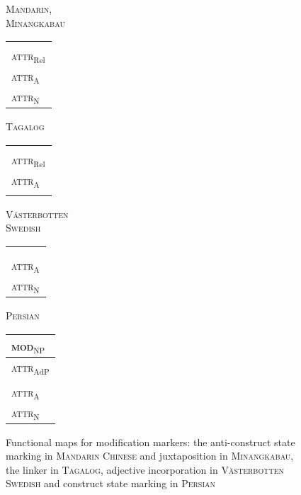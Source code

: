 \begin{figure}
\parbox[b]{0.20\textwidth}{
\begin{center}\textsc{Mandarin},\\\textsc{Minangkabau}\\
\medskip
\begin{tabular}{| l |}
\hline
\\
\hline
\hline
\\
\hline
\textsc{attr}$_{\text{Rel}}$\\
\hline
\textsc{attr}$_{\text{A}}$\\
\hline
\textsc{attr}$_{\text{N}}$\\
\hline
\end{tabular}
\end{center}
}
\parbox[b]{0.20\textwidth}{
\begin{center}\textsc{Tagalog}\\
\bigskip
\begin{tabular}{| l |}
\hline
\\
\hline
\hline
\\
\hline
\textsc{attr}$_{\text{Rel}}$\\
\hline
\textsc{attr}$_{\text{A}}$\\
\hline
\\
\hline
\end{tabular}
\end{center}
}
\parbox[b]{0.20\textwidth}{
\begin{center}\textsc{Västerbotten }\\\textsc{Swedish}\\
\medskip
\begin{tabular}{| l |}
\hline
\\
\hline
\hline
\\
\hline
\\
\hline
\textsc{attr}$_{\text{A}}$\\
\hline
\textsc{attr}$_{\text{N}}$\\
\hline
\end{tabular}
\end{center}
}
\parbox[b]{0.20\textwidth}{
\begin{center}\textsc{Persian}\\
\bigskip
\begin{tabular}{| l |}
\hline
\textsc{mod}$_{\text{NP}}$\\
\hline
\hline
\textsc{attr}$_{\text{AdP}}$\\
\hline
\\
\hline
\textsc{attr}$_{\text{A}}$\\
\hline
\textsc{attr}$_{\text{N}}$\\
\hline
\end{tabular}
\end{center}
}
\caption[Functional map for modification marking]{Functional maps for modification markers: the anti\hyp{}construct state marking in \textsc{Mandarin Chinese} and juxtaposition in \textsc{Minangkabau}, the linker in \textsc{Tagalog}, adjective incorporation in \textsc{Västerbotten Swedish} and construct state marking in \textsc{Persian}
\label{multi abcd}
}
\end{figure}
